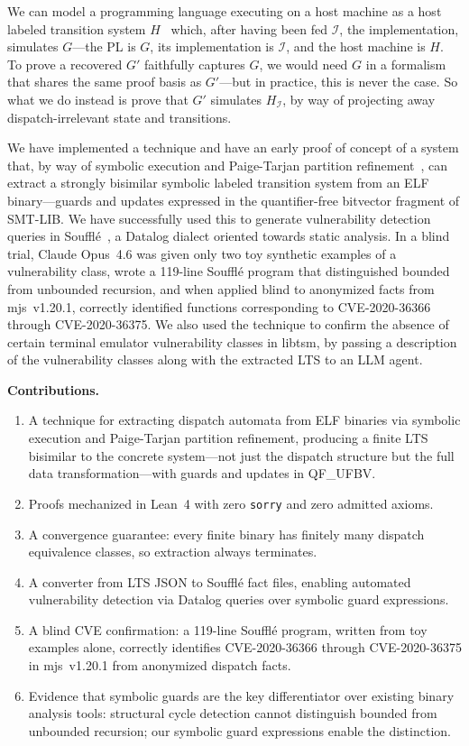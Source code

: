 \documentclass[conference]{./template/IEEEtran}
\begin{document}
We can model a programming language executing on a host machine as a host labeled transition system $H$~\cite{henzinger2000symbolic} which, after having been fed $\mathcal{I}$, the implementation, simulates $G$---the PL is $G$, its implementation is $\mathcal{I}$, and the host machine is $H$. To prove a recovered $G'$ faithfully captures $G$, we would need $G$ in a formalism that shares the same proof basis as $G'$---but in practice, this is never the case. So what we do instead is prove that $G'$ simulates $H_\mathcal{I}$, by way of projecting away dispatch-irrelevant state and transitions.

We have implemented a technique and have an early proof of concept of a system that, by way of symbolic execution and Paige-Tarjan partition refinement~\cite{paige1987three}, can extract a strongly bisimilar symbolic labeled transition system from an ELF binary---guards and updates expressed in the quantifier-free bitvector fragment of SMT-LIB. We have successfully used this to generate vulnerability detection queries in Souffl\'{e}~\cite{jordan2016souffle}, a Datalog dialect oriented towards static analysis. In a blind trial, Claude Opus~4.6 was given only two toy synthetic examples of a vulnerability class, wrote a 119-line Souffl\'{e} program that distinguished bounded from unbounded recursion, and when applied blind to anonymized facts from mjs~v1.20.1, correctly identified functions corresponding to CVE-2020-36366 through CVE-2020-36375. We also used the technique to confirm the absence of certain terminal emulator vulnerability classes in libtsm, by passing a description of the vulnerability classes along with the extracted LTS to an LLM agent.

\smallskip\noindent\textbf{Contributions.}
\begin{enumerate}
\item A technique for extracting dispatch automata from ELF binaries via symbolic execution and Paige-Tarjan partition refinement, producing a finite LTS bisimilar to the concrete system---not just the dispatch structure but the full data transformation---with guards and updates in QF\_UFBV.
\item Proofs mechanized in Lean~4 with zero \texttt{sorry} and zero admitted axioms.
\item A convergence guarantee: every finite binary has finitely many dispatch equivalence classes, so extraction always terminates.
\item A converter from LTS JSON to Souffl\'{e} fact files, enabling automated vulnerability detection via Datalog queries over symbolic guard expressions.
\item A blind CVE confirmation: a 119-line Souffl\'{e} program, written from toy examples alone, correctly identifies CVE-2020-36366 through CVE-2020-36375 in mjs~v1.20.1 from anonymized dispatch facts.
\item Evidence that symbolic guards are the key differentiator over existing binary analysis tools: structural cycle detection cannot distinguish bounded from unbounded recursion; our symbolic guard expressions enable the distinction.
\end{enumerate}
\end{document}
